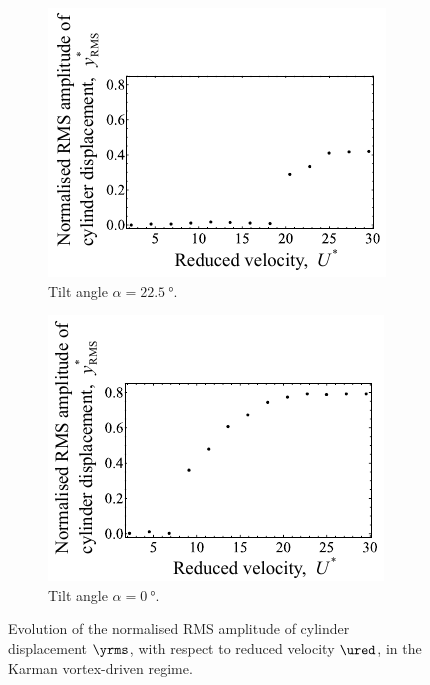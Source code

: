 \documentclass[a4paper,fleqn]{cas-sc}
\begin{document}
\begin{figure}
  \centering
  \begin{subfigure}[h]{0.35\textwidth}
    \includegraphics[width=\textwidth]{figs/yStrRMS4}
    \caption{Tilt angle $\alpha = \SI{22.5}{\degree}$.}
    \label{fig:yStrRMS4}
  \end{subfigure}

  \begin{subfigure}[h]{0.35\textwidth}
    \includegraphics[width=\textwidth]{figs/yStrRMS5}
    \caption{Tilt angle $\alpha = \SI{0}{\degree}$.}
    \label{fig:yStrRMS5}
  \end{subfigure}
  \caption{Evolution of the normalised RMS amplitude of cylinder displacement $\yrms$, with respect to reduced velocity $\ured$, in the Karman vortex-driven regime.} \label{fig:yStrFreqKarman}
\end{figure}
\end{document}
